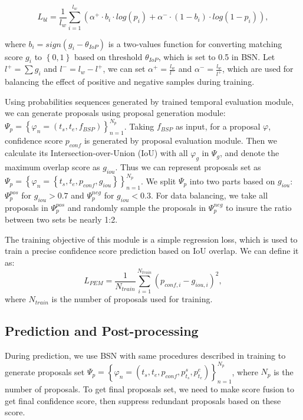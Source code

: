 \documentclass[runningheads]{llncs}
\begin{document}
\begin{small}
\begin{equation}
L_{bl}=\frac{1}{l_w}\sum_{i=1}^{l_w} \left (\alpha^{+} \cdot b_i \cdot  log(p_i)+\alpha^{-} \cdot (1-b_i) \cdot log(1-p_i) \right ),
\end{equation}
\end{small}
where $b_i=sign(g_i-\theta_{IoP})$ is a two-values function for converting matching score $g_i$ to $\left \{0,1  \right \}$ based on threshold $\theta_{IoP}$, which is set to 0.5 in BSN.  Let $l^+=\sum g_i$ and $l^-=l_w-l^+$, we can set $\alpha^+=\frac{l_w}{l^-}$ and $\alpha^-=\frac{l_w}{l^+}$, which are used for balancing the effect of positive and negative samples during training.


Using probabilities sequences generated by trained temporal evaluation module, we can generate proposals using proposal generation module: $\Psi_p  = \left \{ \varphi _n=(t_s,t_e,f_{BSP}) \right \}_{n=1}^{N_p}$. Taking $f_{BSP}$ as input, for a proposal $\varphi$,  confidence score $p_{conf}$ is generated by proposal evaluation module. Then we calculate its Intersection-over-Union (IoU)  with all $\varphi_g$ in $\Psi_g$, and denote the maximum overlap score as $g_{iou}$. Thus we can represent proposals set as $\Psi_p  = \left \{ \varphi _n =\left \{t_s,t_e,p_{conf},g_{iou}   \right \} \right \}_{n=1}^{N_p}$.
%
We split $\Psi_p$ into two parts based on $g_{iou}$: $\Psi_p^{pos}$ for $g_{iou}>0.7$ and  $\Psi_p^{neg}$ for $g_{iou}<0.3$. For data balancing, we take all proposals in $\Psi_p^{pos}$ and randomly sample the proposals in $\Psi_p^{neg}$ to insure the ratio between two sets be nearly 1:2.

The training objective of this module is a simple regression loss, which is used to train a precise confidence score prediction based on IoU overlap. We can define it as:
\begin{equation}
L_{PEM}=\frac{1}{N_{train}} \sum_{i=1}^{N_{train}}(p_{conf,i}-g_{iou,i})^2 ,
\end{equation}
where $N_{train}$ is the number of proposals used for training.

\subsection{Prediction and Post-processing}


During prediction, we use BSN with same procedures described in training to generate proposals set $\Psi_p  = \left \{  \varphi  _n=(t_s, t_e, p_{conf}, p^s_{t_s} ,  p^e_{t_e}  ) \right \}_{n=1}^{N_p}$, where   $N_p$ is the number of proposals.
To get final proposals set, we need to make score fusion to get final confidence score, then suppress redundant proposals based on these score.  
\end{document}
